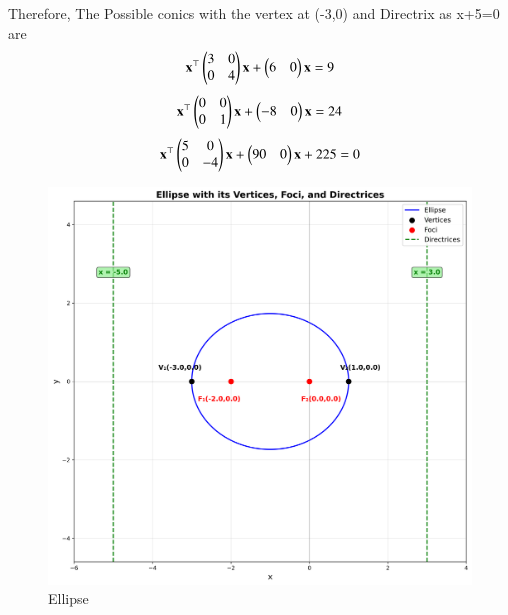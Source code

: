 \documentclass[journal]{IEEEtran}
\begin{document}
\bigskip

Therefore, The Possible conics with the vertex at (-3,0) and Directrix as x+5=0 are\\
$$\mathbf{x}^\top\begin{pmatrix}3 & 0 \\ 0 & 4\end{pmatrix}\mathbf{x} + \begin{pmatrix}6 & 0\end{pmatrix}\mathbf{x} = 9$$
$$\mathbf{x}^\top\begin{pmatrix}0 & 0 \\ 0 & 1\end{pmatrix}\mathbf{x} + \begin{pmatrix}-8 & 0\end{pmatrix}\mathbf{x} = 24$$
$$\mathbf{x}^\top\begin{pmatrix}5 & 0 \\ 0 & -4\end{pmatrix}\mathbf{x} + \begin{pmatrix}90 & 0\end{pmatrix}\mathbf{x} + 225 = 0$$


\begin{figure}
    \centering
    \includegraphics[width=\columnwidth]{figs/fig1.png}
    \caption{Ellipse}
    \label{fig:figs/fig1.png}
\end{figure}
\end{document}
